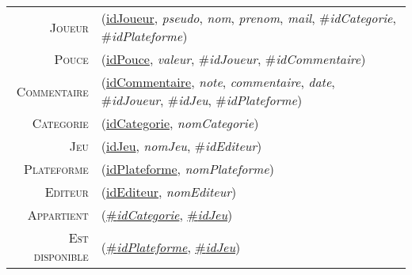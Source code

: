 \documentclass{article}
\newenvironment{mld}
{\par\begin{minipage}{\linewidth}\begin{tabular}{rp{\linewidth}}}
{\end{tabular}\end{minipage}\par}
\newcommand{\relat}[1]{\textsc{#1}}
\newcommand{\attr}[1]{\emph{#1}}
\newcommand{\prim}[1]{\uline{#1}}
\newcommand{\foreign}[1]{\#\textsl{#1}}
\begin{document}
\begin{mld}
  \relat{Joueur} & (\prim{idJoueur}, \attr{pseudo}, \attr{nom}, \attr{prenom}, \attr{mail}, \foreign{idCategorie}, \foreign{idPlateforme})\\
  \relat{Pouce} & (\prim{idPouce}, \attr{valeur}, \foreign{idJoueur}, \foreign{idCommentaire})\\
  \relat{Commentaire} & (\prim{idCommentaire}, \attr{note}, \attr{commentaire}, \attr{date}, \foreign{idJoueur}, \foreign{idJeu}, \foreign{idPlateforme})\\
  \relat{Categorie} & (\prim{idCategorie}, \attr{nomCategorie})\\
  \relat{Jeu} & (\prim{idJeu}, \attr{nomJeu}, \foreign{idEditeur})\\
  \relat{Plateforme} & (\prim{idPlateforme}, \attr{nomPlateforme})\\
  \relat{Editeur} & (\prim{idEditeur}, \attr{nomEditeur})\\
  \relat{Appartient} & (\prim{\foreign{idCategorie}}, \prim{\foreign{idJeu}})\\
  \relat{Est disponible} & (\prim{\foreign{idPlateforme}}, \prim{\foreign{idJeu}})\\
\end{mld}
\end{document}
